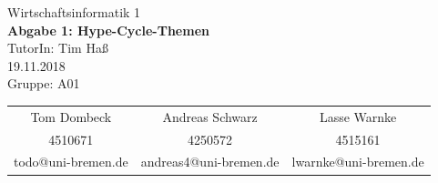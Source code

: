 \documentclass[12pt,utf8]{scrartcl}
\makeatletter
\newcommand{\teilnehmerI}{Tom Dombeck}
\newcommand{\mattI}{4510671}
\newcommand{\mailI}{todo@uni-bremen.de}
\newcommand{\teilnehmerII}{Andreas Schwarz}
\newcommand{\mattII}{4250572}
\newcommand{\mailII}{andreas4@uni-bremen.de}
\newcommand{\teilnehmerIII}{Lasse Warnke}
\newcommand{\mattIII}{4515161}
\newcommand{\mailIII}{lwarnke@uni-bremen.de}
\newcommand{\thisgroup}{A01}
\newcommand{\abgabedatum}{19.11.2018}
\newcommand{\nummer}{1}
\newcommand{\thema}{Hype-Cycle-Themen}
\newcommand{\thistutor}{Tim Haß}
\newcommand{\thiscourse}{Wirtschaftsinformatik 1}
\makeatother
\begin{document}
\begin{titlepage}
	\vspace*{\baselineskip}		
	\centering					
	\LARGE							
	\thiscourse \\ 					
	\vspace{1cm}					
	{\Huge 							
	\textbf{Abgabe \nummer: \thema}} \\ 
	\vspace{1.5cm} 					
	TutorIn: \thistutor \\ 		
	\abgabedatum \\ 				
	\vfill 							
	Gruppe: \thisgroup \\ 			
	\vspace{.5cm} 					
	\large 							
	\begin{tabular}{c|c|c} 		
	\teilnehmerI	& \teilnehmerII & \teilnehmerIII \\ 
	\mattI	& \mattII &  \mattIII\\ 
	\mailI	& \mailII & \mailIII \\ 
	\end{tabular} 
\end{titlepage}
\end{document}
